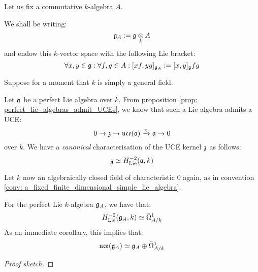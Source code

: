         \begin{convention}
            Let us fix a commutative $k$-algebra $A$.

            We shall be writing:
                $$\g_A := \g \tensor_k A$$
            and endow this $k$-vector space with the following Lie bracket:
                $$\forall x, y \in \mathfrak{g}: \forall f, g \in A: [x f, y g]_{\mathfrak{g}_A} := [x, y]_{\mathfrak{g}} fg$$
        \end{convention}

        \begin{lemma}[$H^{-2}_{\Lie}$ = kernels of UCEs] \label{lemma: kenel_of_UCEs_of_perfect_lie_algebras_is_2nd_homology}
            Suppose for a moment that $k$ is simply a general field.

            Let $\mathfrak{a}$ be a perfect Lie algebra over $k$. From proposition \ref{prop: perfect_lie_algebras_admit_UCEs}, we know that such a Lie algebra admits a UCE:
                $$0 \to \mathfrak{z} \to \mathfrak{uce}(\mathfrak{a}) \xrightarrow[]{\pi} \mathfrak{a} \to 0$$
            over $k$. We have a \textit{canonical} characterisation of the UCE kernel $\mathfrak{z}$ as follows:
                $$\mathfrak{z} \simeq H^{-2}_{\mathrm{Lie}}(\mathfrak{a}, k)$$
        \end{lemma}
        \begin{lemma}
            
        \end{lemma}
        \begin{theorem} \label{theorem: kassel_realisation}
            \cite[Corollary 3.5]{kassel_universal_central_extensions_of_lie_algebras} Let $k$ now an algebraically closed field of characteristic $0$ again, as in convention \ref{conv: a_fixed_finite_dimensional_simple_lie_algebra}. 

            For the perfect Lie $k$-algebra $\mathfrak{g}_A$, we have that:
                $$H^{-2}_{\mathrm{Lie}}(\mathfrak{g}_A, k) \simeq \bar{\Omega}^1_{A/k}$$
            As an immediate corollary, this implies that:
                $$\mathfrak{uce}(\mathfrak{g}_A) \simeq \mathfrak{g}_A \oplus \bar{\Omega}^1_{A/k}$$
        \end{theorem}
            \begin{proof}[Proof sketch]
                
            \end{proof}